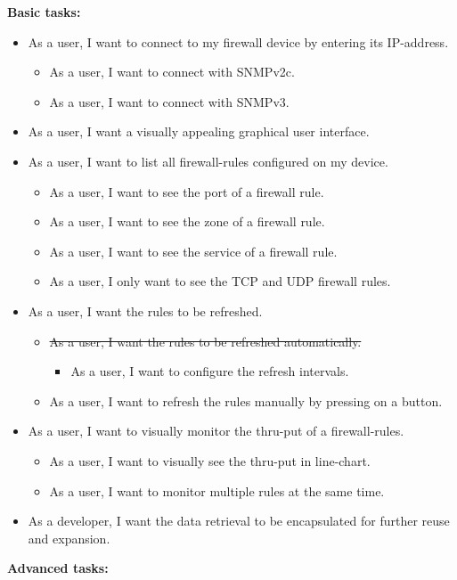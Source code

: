 \documentclass[11pt, a4paper]{article}
\begin{document}
\vspace{10pt}
\noindent \textbf{Basic tasks:}
\begin{itemize}
\item As a user, I want to connect to my firewall device by entering its IP-address.
\begin{itemize}
\item As a user, I want to connect with SNMPv2c.
\item As a user, I want to connect with SNMPv3.
\end{itemize}
\item As a user, I want a visually appealing graphical user interface.
\item As a user, I want to list all firewall-rules configured on my device.
\begin{itemize}
\item As a user, I want to see the port of a firewall rule.
\item As a user, I want to see the zone of a firewall rule.
\item As a user, I want to see the service of a firewall rule.
\item As a user, I only want to see the TCP and UDP firewall rules.
\end{itemize}
\item As a user, I want the rules to be refreshed.
\begin{itemize}
\item \sout{As a user, I want the rules to be refreshed automatically.}
\begin{itemize}
\item As a user, I want to configure the refresh intervals.
\end{itemize}
\item As a user, I want to refresh the rules manually by pressing on a button.
\end{itemize}
\item As a user, I want to visually monitor the thru-put of a firewall-rules.
\begin{itemize}
\item As a user, I want to visually see the thru-put in line-chart.
\item As a user, I want to monitor multiple rules at the same time.
\end{itemize}
\item As a developer, I want the data retrieval to be encapsulated for further reuse and expansion.
\end{itemize}
\noindent \textbf{Advanced tasks:}
\end{document}

